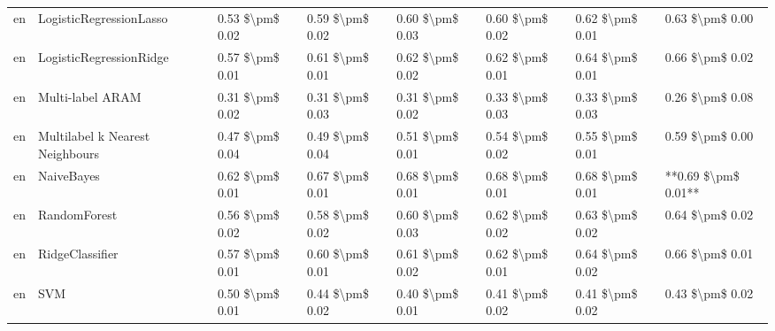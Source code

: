 \begin{tabular}{llllllll}
      en &         LogisticRegressionLasso & 0.53 \$\textbackslash pm\$ 0.02 &           0.59 \$\textbackslash pm\$ 0.02 &       0.60 \$\textbackslash pm\$ 0.03 &        0.60 \$\textbackslash pm\$ 0.02 &                         0.62 \$\textbackslash pm\$ 0.01 &     0.63 \$\textbackslash pm\$ 0.00 \\
      en &         LogisticRegressionRidge & 0.57 \$\textbackslash pm\$ 0.01 &           0.61 \$\textbackslash pm\$ 0.01 &       0.62 \$\textbackslash pm\$ 0.02 &        0.62 \$\textbackslash pm\$ 0.01 &                         0.64 \$\textbackslash pm\$ 0.01 &     0.66 \$\textbackslash pm\$ 0.02 \\
      en &                Multi-label ARAM & 0.31 \$\textbackslash pm\$ 0.02 &           0.31 \$\textbackslash pm\$ 0.03 &       0.31 \$\textbackslash pm\$ 0.02 &        0.33 \$\textbackslash pm\$ 0.03 &                         0.33 \$\textbackslash pm\$ 0.03 &     0.26 \$\textbackslash pm\$ 0.08 \\
      en & Multilabel k Nearest Neighbours & 0.47 \$\textbackslash pm\$ 0.04 &           0.49 \$\textbackslash pm\$ 0.04 &       0.51 \$\textbackslash pm\$ 0.01 &        0.54 \$\textbackslash pm\$ 0.02 &                         0.55 \$\textbackslash pm\$ 0.01 &     0.59 \$\textbackslash pm\$ 0.00 \\
      en &                      NaiveBayes & 0.62 \$\textbackslash pm\$ 0.01 &           0.67 \$\textbackslash pm\$ 0.01 &       0.68 \$\textbackslash pm\$ 0.01 &        0.68 \$\textbackslash pm\$ 0.01 &                         0.68 \$\textbackslash pm\$ 0.01 & **0.69 \$\textbackslash pm\$ 0.01** \\
      en &                    RandomForest & 0.56 \$\textbackslash pm\$ 0.02 &           0.58 \$\textbackslash pm\$ 0.02 &       0.60 \$\textbackslash pm\$ 0.03 &        0.62 \$\textbackslash pm\$ 0.02 &                         0.63 \$\textbackslash pm\$ 0.02 &     0.64 \$\textbackslash pm\$ 0.02 \\
      en &                 RidgeClassifier & 0.57 \$\textbackslash pm\$ 0.01 &           0.60 \$\textbackslash pm\$ 0.01 &       0.61 \$\textbackslash pm\$ 0.02 &        0.62 \$\textbackslash pm\$ 0.01 &                         0.64 \$\textbackslash pm\$ 0.02 &     0.66 \$\textbackslash pm\$ 0.01 \\
      en &                             SVM & 0.50 \$\textbackslash pm\$ 0.01 &           0.44 \$\textbackslash pm\$ 0.02 &       0.40 \$\textbackslash pm\$ 0.01 &        0.41 \$\textbackslash pm\$ 0.02 &                         0.41 \$\textbackslash pm\$ 0.02 &     0.43 \$\textbackslash pm\$ 0.02 \\

\end{tabular}
